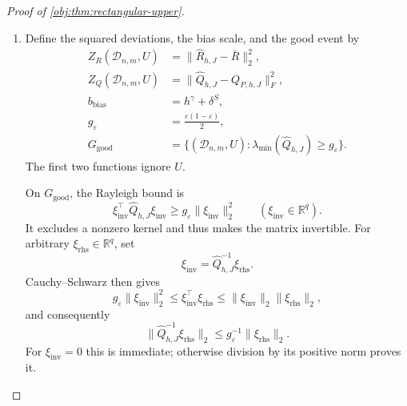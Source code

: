 \begin{proof}[Proof of \cref{obj:thm:rectangular-upper}]
\begin{enumerate}
\item Define the squared deviations, the bias scale, and the good event by
\[
\begin{aligned}
Z_R(\mathcal D_{n,m},U)
 &=\|\widehat R_{h,J}-\bar R\|_2^2,\\
Z_Q(\mathcal D_{n,m},U)
 &=\|\widehat Q_{h,J}-Q_{P,h,J}\|_F^2,\\
b_{\mathrm{bias}}&=h^\gamma+\delta^S,\\
g_\varepsilon&=\frac{\varepsilon(1-\varepsilon)}2,\\
G_{\mathrm{good}}
 &=\{(\mathcal D_{n,m},U):
       \lambda_{\min}(\widehat Q_{h,J})\ge g_\varepsilon\}.
\end{aligned}
\]
The first two functions ignore \(U\).

On \(G_{\mathrm{good}}\), the Rayleigh bound is
\[
\xi_{\mathrm{inv}}^\top\widehat Q_{h,J}\xi_{\mathrm{inv}}
 \ge g_\varepsilon\|\xi_{\mathrm{inv}}\|_2^2
\qquad(\xi_{\mathrm{inv}}\in\mathbb R^q).
\]
It excludes a nonzero kernel and thus makes the matrix invertible.
For arbitrary \(\xi_{\mathrm{rhs}}\in\mathbb R^q\), set
\[
\xi_{\mathrm{inv}}=\widehat Q_{h,J}^{-1}\xi_{\mathrm{rhs}}.
\]
Cauchy--Schwarz then gives
\[
g_\varepsilon\|\xi_{\mathrm{inv}}\|_2^2
\le \xi_{\mathrm{inv}}^\top\xi_{\mathrm{rhs}}
\le \|\xi_{\mathrm{inv}}\|_2\|\xi_{\mathrm{rhs}}\|_2,
\]
and consequently
\[
\|\widehat Q_{h,J}^{-1}\xi_{\mathrm{rhs}}\|_2
\le g_\varepsilon^{-1}\|\xi_{\mathrm{rhs}}\|_2.
\]
For \(\xi_{\mathrm{inv}}=0\) this is immediate; otherwise division by its positive norm proves it.


\end{enumerate}
\end{proof}
